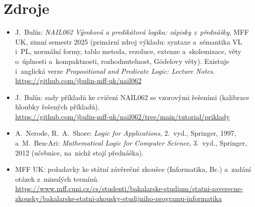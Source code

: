\documentclass[11pt,a4paper]{article}
\begin{document}
\section*{Zdroje}

{\raggedright
\begin{itemize}
  \item J.~Bulín: \emph{NAIL062 Výroková a predikátová logika: zápisky z~přednášky}, MFF UK, zimní semestr 2025 (primární zdroj výkladu: syntaxe a~sémantika VL i~PL, normální formy, tablo metoda, rezoluce, extenze a~skolemizace, věty o~úplnosti a~kompaktnosti, rozhodnutelnost, Gödelovy věty). Existuje i~anglická verze \emph{Propositional and Predicate Logic: Lecture Notes}.\\ \url{https://github.com/jbulin-mff-uk/nail062}
  \item J.~Bulín: sady příkladů ke cvičení NAIL062 se vzorovými řešeními (kalibrace hloubky řešených příkladů).\\ \url{https://github.com/jbulin-mff-uk/nail062/tree/main/tutorial/priklady}
  \item A.~Nerode, R.~A.~Shore: \emph{Logic for Applications}, 2.~vyd., Springer, 1997, a~M.~Ben-Ari: \emph{Mathematical Logic for Computer Science}, 3.~vyd., Springer, 2012 (učebnice, na~nichž stojí přednáška).
  \item MFF UK: požadavky ke státní závěrečné zkoušce (Informatika, Bc.) a~zadání otázek z~minulých termínů.\\ \url{https://www.mff.cuni.cz/cs/studenti/bakalarske-studium/statni-zaverecne-zkousky/bakalarske-statni-zkousky-studijniho-programu-informatika}
\end{itemize}
\par}
\end{document}
